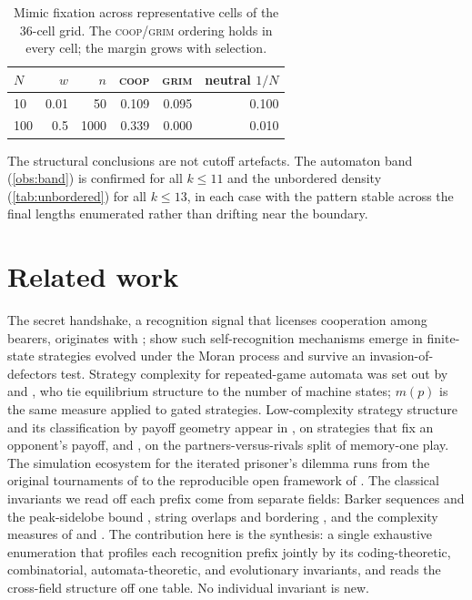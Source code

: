 \begin{table}[t]
  \centering
  \caption{Mimic fixation across representative cells of the $36$-cell grid. The
  \textsc{coop}/\textsc{grim} ordering holds in every cell; the margin grows with selection.}
  \label{tab:sensitivity}
  \begin{tabular}{lrrrrr}
    \toprule
    $N$ & $w$ & $n$ & \textsc{coop} & \textsc{grim} & neutral $1/N$ \\
    \midrule
    10  & 0.01 & 50   & 0.109 & 0.095 & 0.100 \\
    100 & 0.5  & 1000 & 0.339 & 0.000 & 0.010 \\
    \bottomrule
  \end{tabular}
\end{table}

The structural conclusions are not cutoff artefacts. The automaton band (\cref{obs:band}) is
confirmed for all $k\le 11$ and the unbordered density (\cref{tab:unbordered}) for all $k\le 13$,
in each case with the pattern stable across the final lengths enumerated rather than drifting
near the boundary.

\section{Related work}\label{sec:related}

The secret handshake, a recognition signal that licenses cooperation among bearers, originates
with \citet{robson1990}; \citet{knight2018} show such self-recognition mechanisms emerge in
finite-state strategies evolved under the Moran process and survive an invasion-of-defectors
test. Strategy complexity for repeated-game automata was set out by \citet{rubinstein1986} and
\citet{abreu1988}, who tie equilibrium structure to the number of machine states; $m(p)$ is the
same measure applied to gated strategies. Low-complexity strategy structure and its
classification by payoff geometry appear in \citet{press2012}, on strategies that fix an
opponent's payoff, and \citet{hilbe2018}, on the partners-versus-rivals split of memory-one
play. The simulation ecosystem for the iterated prisoner's dilemma runs from the original
tournaments of \citet{axelrod1984} to the reproducible open framework of \citet{knight2016}.
The classical invariants we read off each prefix come from separate fields: Barker sequences
and the peak-sidelobe bound \citep{barker1953,turyn1961}, string overlaps and bordering
\citep{guibas1981}, and the complexity measures of \citet{lempel1976} and \citet{massey1969}.
The contribution here is the synthesis: a single exhaustive enumeration that profiles each
recognition prefix jointly by its coding-theoretic, combinatorial, automata-theoretic, and
evolutionary invariants, and reads the cross-field structure off one table. No individual
invariant is new.

